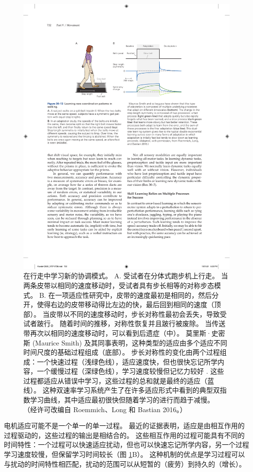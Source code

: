 \begin{figure}[htbp]
	\centering
	\includegraphics[width=0.7\linewidth]{chap30/fig_30_13}
	\caption{在行走中学习新的协调模式。 A. 受试者在分体式跑步机上行走。 当两条皮带以相同的速度移动时，受试者具有步长相等的对称步态模式。 B. 在一项适应性研究中，皮带的速度最初是相同的，然后分开，使得右边的皮带移动得比左边的快，最后回到相同的速度（顶部）。 当皮带以不同的速度移动时，步长对称性最初会丢失，导致受试者跛行。 随着时间的推移，对称性恢复并且跛行被废除。 当传送带再次以相同的速度移动时，可以看到后遗症（中）。 莫里斯·史密斯 (Maurice Smith) 及其同事表明，这种类型的适应由多个适应不同时间尺度的基础过程组成（底部）。 步长对称性的变化由两个过程组成：一个快速过程（浅绿色线），适应速度快，但也很快忘记所学内容，一个缓慢过程（深绿色线），学习速度较慢但记忆力较好 . 这些过程都适应从错误中学习，这些过程的总和就是最终的适应（蓝线）。 这种双速率学习系统产生了在许多适应形式中看到的典型双指数学习曲线，其中适应最初很快但随着学习的进行而趋于减慢。 （经许可改编自 Roemmich、Long 和 Bastian 2016。）}
	\label{fig:30_13}
\end{figure}

电机适应可能不是一个单一的单一过程。 最近的证据表明，适应是由相互作用的过程驱动的，这些过程的输出是相结合的。 这些相互作用的过程可能具有不同的时间特性：一个过程可以快速适应扰动，但也可以快速忘记所学内容，另一个过程学习速度较慢，但保留学习时间较长（图 \ref{fig:30_13}B）。 这种机制的优点是学习过程可以与扰动的时间特性相匹配，扰动的范围可以从短暂的（疲劳）到持久的（增长）。

